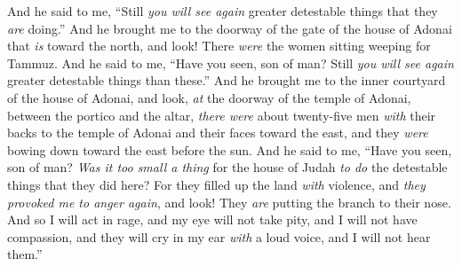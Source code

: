 \begin{biblechapter}
\verse And he said to me, “Still \textit{you will see again} greater detestable things that they \textit{are} doing.”
\verse And he brought me to the doorway of the gate of the house of Adonai that \textit{is} toward the north, and look! There \textit{were} the women sitting weeping for Tammuz.
\verse And he said to me, “Have you seen, son of man? Still \textit{you will see again} greater detestable things than these.”
\verse And he brought me to the inner courtyard of the house of Adonai, and look, \textit{at} the doorway of the temple of Adonai, between the portico and the altar, \textit{there were} about twenty-five men \textit{with} their backs to the temple of Adonai and their faces toward the east, and they \textit{were} bowing down toward the east before the sun.
\verse And he said to me, “Have you seen, son of man? \textit{Was it too small a thing} for the house of Judah \textit{to do} the detestable things that they did here? For they filled up the land \textit{with} violence, and \textit{they provoked me to anger again}, and look! They \textit{are} putting the branch to their nose.
\verse And so I will act in rage, and my eye will not take pity, and I will not have compassion, and they will cry in my ear \textit{with} a loud voice, and I will not hear them.”
\end{biblechapter}

